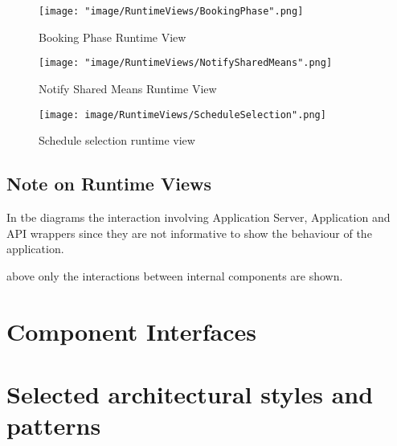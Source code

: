 \begin{figure}[H]
\begin{center}
\texttt{[image: "image/RuntimeViews/BookingPhase".png]}
\caption{Booking Phase Runtime View}
\end{center}
\end{figure}

\begin{figure}[H]
\begin{center}
\texttt{[image: "image/RuntimeViews/NotifySharedMeans".png]}
\caption{Notify Shared Means Runtime View}
\end{center}
\end{figure}


\begin{figure}[H]
\begin{center}
\texttt{[image: image/RuntimeViews/ScheduleSelection".png]}
\caption{Schedule selection runtime view}
\end{center}
\end{figure}

\subsection{Note on Runtime Views}
In tbe diagrams the interaction involving Application Server, Application and API wrappers since they are not informative to show the behaviour of the application.

above only the interactions between internal components are shown.

\section{Component Interfaces}

\section{Selected architectural styles and patterns}

